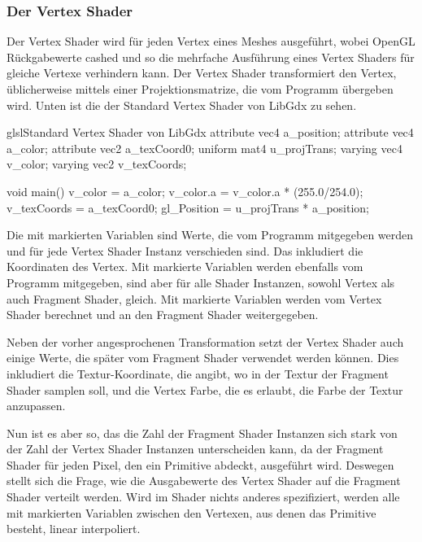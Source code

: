 \subsubsection{Der Vertex Shader}

Der Vertex Shader wird für jeden Vertex eines Meshes ausgeführt, wobei OpenGL Rückgabewerte cashed und so die mehrfache
Ausführung eines Vertex Shaders für gleiche Vertexe verhindern kann.
Der Vertex Shader transformiert den Vertex, üblicherweise mittels einer Projektionsmatrize, die vom Programm übergeben
wird.
Unten ist die der Standard Vertex Shader von LibGdx zu sehen.

\begin{codeBlock}{glsl}{Standard Vertex Shader von LibGdx}
attribute vec4 a_position;
attribute vec4 a_color;
attribute vec2 a_texCoord0;
uniform mat4 u_projTrans;
varying vec4 v_color;
varying vec2 v_texCoords;

void main() {
    v_color = a_color;
    v_color.a = v_color.a * (255.0/254.0);
    v_texCoords = a_texCoord0;
    gl_Position = u_projTrans * a_position;
}
\end{codeBlock}

Die mit  markierten Variablen sind Werte, die vom Programm mitgegeben werden und für jede
Vertex Shader Instanz verschieden sind.
Das inkludiert \zB die Koordinaten des Vertex.
Mit  markierte Variablen werden ebenfalls vom Programm mitgegeben, sind aber für alle Shader Instanzen,
sowohl Vertex als auch Fragment Shader, gleich.
Mit  markierte Variablen werden vom Vertex Shader berechnet und an den Fragment Shader weitergegeben.

Neben der vorher angesprochenen Transformation setzt der Vertex Shader auch einige Werte, die später vom Fragment
Shader verwendet werden können.
Dies inkludiert die Textur-Koordinate, die angibt, wo in der Textur der Fragment Shader samplen soll, und die Vertex
Farbe, die es erlaubt, die Farbe der Textur anzupassen.

Nun ist es aber so, das die Zahl der Fragment Shader Instanzen sich stark von der Zahl der Vertex Shader Instanzen
unterscheiden kann, da der Fragment Shader für jeden Pixel, den ein Primitive abdeckt, ausgeführt wird.
Deswegen stellt sich die Frage, wie die Ausgabewerte des Vertex Shader auf die Fragment Shader verteilt werden.
Wird im Shader nichts anderes spezifiziert, werden alle mit  markierten Variablen zwischen den
Vertexen, aus denen das Primitive besteht, linear interpoliert.

